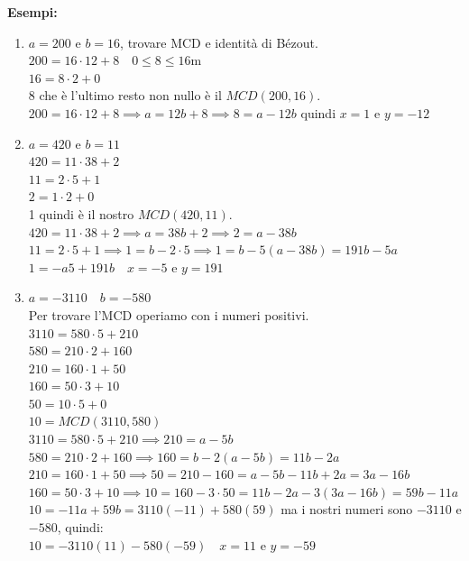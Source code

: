 \documentclass[12pt, letterpaper]{report}
\begin{document}
		\textbf{Esempi:}
		\begin{enumerate}
			\item $a = 200$ e $b = 16$, trovare MCD e identità di Bézout. \\
			$200 = 16 \cdot 12 + 8 \quad 0 \leq 8 \leq 16$m\\
			$16 = 8 \cdot 2 + 0$ \\
			8 che è l'ultimo resto non nullo è il $MCD(200, 16)$. \\
			$200 = 16 \cdot 12  + 8 \implies a = 12b + 8 \implies 8 = a - 12b$ quindi $x = 1$ e $y = -12$
			\item $a = 420$ e $b = 11$ \\
			$420 = 11  \cdot 38 + 2$ \\
			$11 = 2 \cdot 5 + 1$ \\
			$2 = 1 \cdot 2 + 0$ \\
			1 quindi è il nostro $MCD(420, 11)$. \\
			$420 = 11 \cdot 38 + 2 \implies a = 38b + 2 \implies 2 = a - 38b$ \\
			$11 = 2 \cdot 5 + 1 \implies 1 = b - 2 \cdot 5 \implies 1 = b - 5(a - 38b) = 191b - 5a$ \\
			$1 = -a5 + 191b \quad x = -5$ e $y = 191$
			\item $a = -3110 \quad b = -580$ \\
			Per trovare l'MCD operiamo con i numeri positivi. \\
			$3110 = 580 \cdot 5 + 210$ \\
			$580 = 210 \cdot 2 + 160$ \\
			$210 = 160 \cdot 1 + 50$ \\
			$160 = 50 \cdot 3 + 10$ \\
			$50 = 10 \cdot 5 + 0$ \\
			$10 = MCD(3110, 580)$ \\
			$3110 = 580 \cdot 5 + 210 \implies 210 = a - 5b$ \\
			$580 = 210 \cdot 2 + 160 \implies 160 = b - 2(a - 5b) = 11b - 2a$ \\
			$210 = 160 \cdot 1 + 50 \implies 50 = 210 - 160 = a - 5b -11b + 2a = 3a - 16b$ \\
			$160 = 50 \cdot 3 + 10 \implies 10 = 160 - 3 \cdot 50 = 11b - 2a - 3(3a - 16b) = 59b - 11a$ \\
			$10 = -11a + 59b = 3110(-11) + 580(59)$ ma i nostri numeri sono $-3110$ e $-580$, quindi: \\
			$10 = -3110(11) - 580(-59) \quad x = 11$ e $y = -59$
		\end{enumerate}
\end{document}
